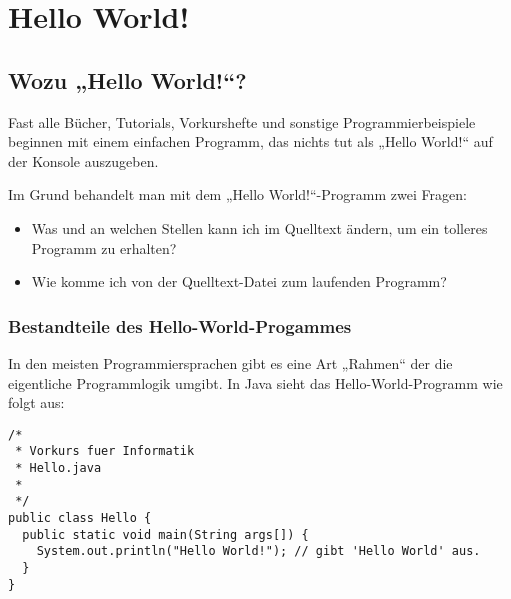 \chapter {Hello World!}
\lstset{language=Java}

\section {Wozu „Hello World!“?}

Fast alle Bücher, Tutorials, Vorkurshefte und sonstige Programmierbeispiele beginnen mit einem einfachen Programm, das nichts tut als „Hello World!“ auf der Konsole auszugeben.

Im Grund behandelt man mit dem „Hello World!“-Programm zwei Fragen:
\begin{itemize}
\item Was und an welchen Stellen kann ich im Quelltext ändern, um ein tolleres Programm zu erhalten?
\item Wie komme ich von der Quelltext-Datei zum laufenden Programm?
\end{itemize}

\subsection{Bestandteile des Hello-World-Progammes}
In den meisten Programmiersprachen gibt es eine Art „Rahmen“ der die eigentliche Programmlogik umgibt.
In Java sieht das Hello-World-Programm wie folgt aus: 
\begin{lstlisting}
/*
 * Vorkurs fuer Informatik
 * Hello.java
 *
 */
public class Hello {
  public static void main(String args[]) {
    System.out.println("Hello World!");	// gibt 'Hello World' aus.
  }
}
\end{lstlisting}

